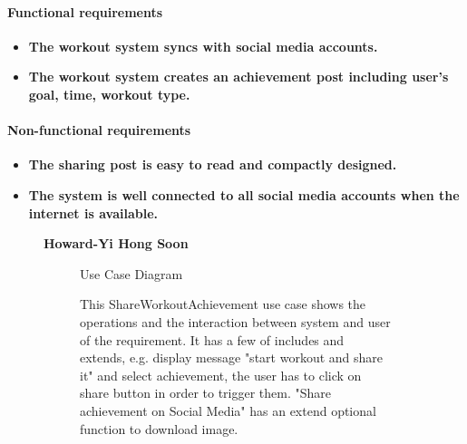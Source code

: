 \documentclass{article}
\begin{document}
		\paragraph{Functional requirements}

		\begin{itemize}
			\item \textbf{The workout system syncs with social media accounts.}
			\item \textbf{The workout system creates an achievement post including user's goal, time, workout type.}
		\end{itemize}
		
		\paragraph{Non-functional requirements}
		
		\begin{itemize}
			\item \textbf{The sharing post is easy to read and compactly designed.}
			\item \textbf{The system is well connected to all social media accounts when the internet is available.}
		\end{itemize}
		
	\newpage

	\begin{figure}[htbp]
		\textbf{Howard-Yi Hong Soon}
		\centering
		\begin{subfigure}{\textwidth}
			\resizebox{\textwidth}{!}{}
			\caption{Use Case Diagram}
		\end{subfigure}
		\begin{subfigure}{\textwidth}
			This ShareWorkoutAchievement use case shows the operations and the interaction between system and user
			of the requirement. It has a few of includes and extends, e.g. display message "start workout and share it" and
			select achievement, the user has to click on share button in order to trigger them. "Share achievement on Social Media" has an extend
			optional function to download image. 
		\end{subfigure}
	\end{figure}

	\newpage
\end{document}
